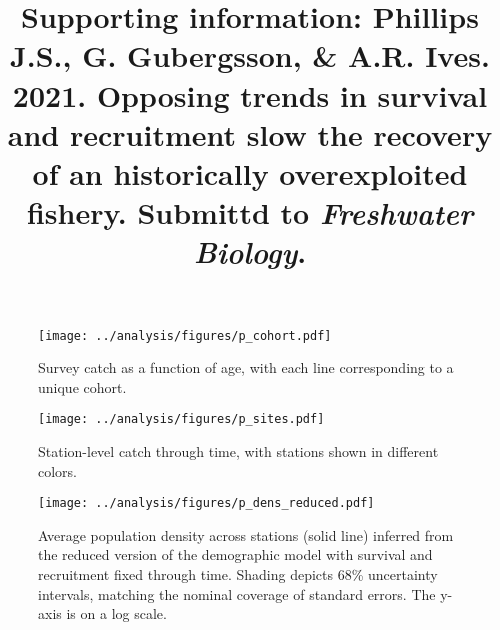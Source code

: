 \documentclass[11pt]{article}
\title{\textbf{Supporting information:}
          Phillips J.S., G. Gu{\dh}bergsson, & A.R. Ives. 
          2021. Opposing trends in survival and recruitment slow the recovery 
          of an historically overexploited fishery. 
          Submittd to \textit{Freshwater Biology}.}
\date{}
\makeatletter
\renewcommand{\maketitle}{\bgroup\setlength{\parindent}{0pt}
\begin{flushleft}
  \@title
\end{flushleft}\egroup
}
\makeatother
\begin{document}
\setlength\parindent{0.25in}

\maketitle


\linenumbers{}

\clearpage


\renewcommand{\thefigure}{S\arabic{figure}}
\renewcommand{\theequation}{S\arabic{equation}}
\renewcommand{\thetable}{S\arabic{table}}
\setcounter{equation}{0}
\setcounter{figure}{0}
\setcounter{table}{0}

\begin{figure}
\centering
\texttt{[image: ../analysis/figures/p\_cohort.pdf]}
\caption{\label{fig:p_cohort}
Survey catch as a function of age, with each line corresponding to a unique cohort.
}
\end{figure}
\clearpage

\begin{figure}
\centering
\texttt{[image: ../analysis/figures/p\_sites.pdf]}
\caption{\label{fig:p_sites}
Station-level catch through time, with stations shown in different colors.
}
\end{figure}
\clearpage

\clearpage
\begin{figure}
\centering
\texttt{[image: ../analysis/figures/p\_dens\_reduced.pdf]}
\caption{\label{fig:p_dens_reduced}
Average population density across stations (solid line)
inferred from the reduced version of the demographic model 
with survival and recruitment fixed through time.
Shading depicts 68\% uncertainty intervals, 
matching the nominal coverage of standard errors.
The y-axis is on a log scale.
}
\end{figure}
\clearpage
\end{document}
